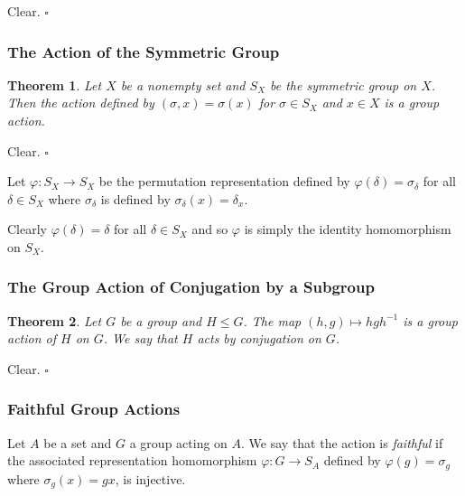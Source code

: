 \documentclass[10pt]{article}
\newtheorem{theorem}{Theorem}[section]
\newenvironment{proof}[1][Proof]{\begin{trivlist}
\item[\hskip \labelsep {\itshape #1}]}{\end{trivlist}}
\newenvironment{definition}[1][Definition]{\begin{trivlist}
\item[\hskip \labelsep {\bfseries #1}]}{\end{trivlist}}
\begin{document}
\begin{proof}
Clear. $\square$
\end{proof}

\subsubsection{The Action of the Symmetric Group}

\begin{theorem}
Let $X$ be a nonempty set and $S_X$ be the symmetric group on $X$. Then the action defined by $(\sigma, x) = \sigma(x)$ for $\sigma \in S_X$ and $x \in X$ is a group action.
\end{theorem}

\begin{proof}
Clear. $\square$
\end{proof}

Let $\varphi : S_X \to S_X$ be the permutation representation defined by $\varphi(\delta) = \sigma_{\delta}$ for all $\delta \in S_X$ where $\sigma_\delta$ is defined by $\sigma_\delta(x) = \delta_x$.

Clearly $\varphi(\delta) = \delta$ for all $\delta \in S_X$ and so $\varphi$ is simply the identity homomorphism on $S_X$.

\subsubsection{The Group Action of Conjugation by a Subgroup}

\begin{theorem}
Let $G$ be a group and $H \leq G$. The map $(h, g) \mapsto hgh^{-1}$ is a group action of $H$ on $G$. We say that $H$ acts by conjugation on $G$.
\end{theorem}

\begin{proof}
Clear. $\square$
\end{proof}

\subsubsection{Faithful Group Actions}

\begin{definition}
Let $A$ be a set and $G$ a group acting on $A$. We say that the action is \emph{faithful} if the associated representation homomorphism $\varphi : G \to S_A$ defined by $\varphi(g) = \sigma_g$ where $\sigma_g(x) = gx$, is injective.
\end{definition}
\end{document}
